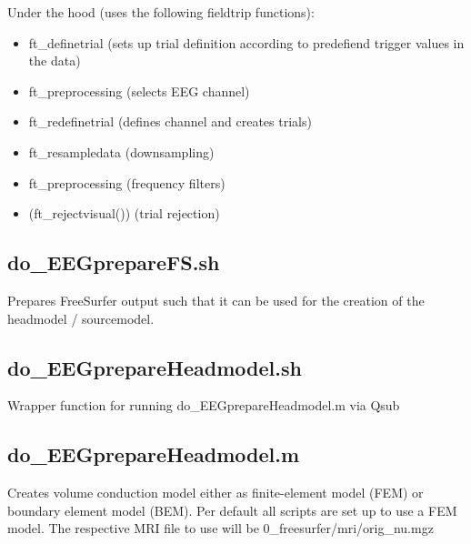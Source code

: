 \documentclass[12pt,a4paper]{scrartcl}
\begin{document}
\noindent Under the hood (uses the following fieldtrip functions):
\begin{itemize}
\item ft\_definetrial (sets up trial definition according to predefiend trigger values in the data)
\item ft\_preprocessing (selects EEG channel)
\item ft\_redefinetrial (defines channel and creates trials)
\item ft\_resampledata (downsampling)
\item ft\_preprocessing (frequency filters)
\item (ft\_rejectvisual()) (trial rejection)
\end{itemize}

\subsection{do\_EEGprepareFS.sh}
\label{sec:prepFS4EEG}
Prepares FreeSurfer output such that it can be used for the creation of the headmodel / sourcemodel.

\subsection{do\_EEGprepareHeadmodel.sh}
\label{sec:prepHM}
Wrapper function for running do\_EEGprepareHeadmodel.m via Qsub

\subsection{do\_EEGprepareHeadmodel.m}
Creates volume conduction model either as finite-element model (FEM) or boundary element model (BEM). Per default all scripts are set up to use a FEM model. The respective MRI file to use will be 0\_freesurfer/mri/orig\_nu.mgz\\
\end{document}
